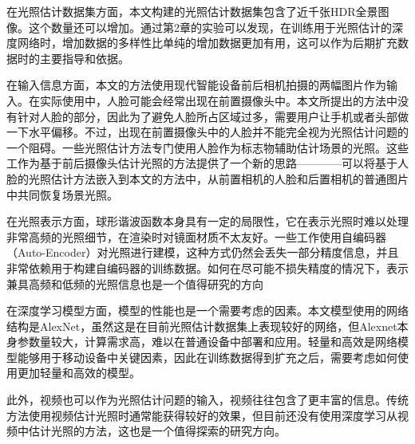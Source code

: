 在光照估计数据集方面，本文构建的光照估计数据集包含了近千张HDR全景图像。这个数量还可以增加。通过第2章的实验可以发现，在训练用于光照估计的深度网络时，增加数据的多样性比单纯的增加数据更加有用，这可以作为后期扩充数据时的主要指导和依据。

在输入信息方面，本文的方法使用现代智能设备前后相机拍摄的两幅图片作为输入。在实际使用中，人脸可能会经常出现在前置摄像头中。本文所提出的方法中没有针对人脸的部分，因此为了避免人脸所占区域过多，需要用户让手机或者头部做一下水平偏移。不过，出现在前置摄像头中的人脸并不能完全视为光照估计问题的一个阻碍。一些光照估计方法专门使用人脸作为标志物辅助估计场景的光照。这些工作为基于前后摄像头估计光照的方法提供了一个新的思路————可以将基于人脸的光照估计方法嵌入到本文的方法中，从前置相机的人脸和后置相机的普通图片中共同恢复场景光照。

在光照表示方面，球形谐波函数本身具有一定的局限性，它在表示光照时难以处理非常高频的光照细节，在渲染时对镜面材质不太友好。一些工作使用自编码器（Auto-Encoder）对光照进行建模，这种方式仍然会丢失一部分精度信息，并且非常依赖用于构建自编码器的训练数据。如何在尽可能不损失精度的情况下，表示兼具高频和低频的光照信息也是一个值得研究的方向

在深度学习模型方面，模型的性能也是一个需要考虑的因素。本文模型使用的网络结构是AlexNet，虽然这是在目前光照估计数据集上表现较好的网络，但Alexnet本身参数量较大，计算需求高，难以在普通设备中部署和应用。轻量和高效是网络模型能够用于移动设备中关键因素，因此在训练数据得到扩充之后，需要考虑如何使用更加轻量和高效的模型。

此外，视频也可以作为光照估计问题的输入，视频往往包含了更丰富的信息。传统方法使用视频估计光照时通常能获得较好的效果，但目前还没有使用深度学习从视频中估计光照的方法，这也是一个值得探索的研究方向。